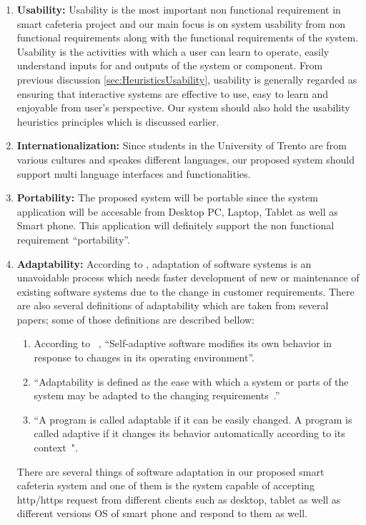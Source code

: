 \begin{enumerate}

\item \textbf{Usability:} Usability is the most important non functional
requirement in smart cafeteria project and our main focus is on system usability
from non functional requirements along with the functional requirements of the
system. Usability is the activities with which a user can learn to operate,
easily understand inputs for and outputs of the system or component. From
previous discussion \ref{sec:HeuristicsUsability}, usability is generally
regarded as ensuring that interactive systems are effective to use, easy to
learn and enjoyable from user's perspective. Our system should also hold the
usability heuristics principles which is discussed earlier.

\item \textbf{Internationalization:} Since students in the University of Trento
are from various cultures and speakes different languages, our proposed system
should support multi language interfaces and functionalities.

\item \textbf{Portability:} The proposed system will be portable since the
system application will be accesable from Desktop PC, Laptop, Tablet as well as
Smart phone. This application will definitely support the non functional
requirement ``portability''.

\item \textbf{Adaptability:} According to \citet{Subramanian2001}, adaptation of
software systems is an unavoidable process which needs faster development of new
 or maintenance of existing software systems  due to the change in customer
requirements. There are also several definitions of adaptability which are taken
from several papers; some of those definitions are described bellow:
\begin{enumerate}
\item  According to ~\citet{Oreizy:769885:Gorlick}, ``Self-adaptive software
modifies its own behavior in response to changes in its operating environment''.

\item  ``Adaptability is defined as the ease with which a system or parts of the
system may be adapted to the changing
requirements~\cite{Subramanian2001,Tekinerdogan}.''

\item  ``A program is called adaptable if it can be easily changed. A program is
called adaptive if it changes its behavior automatically according to its
context~\cite{Subramanian2001,Lieberherr1995}".
\end{enumerate}
There are several things of software adaptation in our proposed smart cafeteria
system and one of them is the system capable of accepting http/https request
from different clients such as desktop, tablet as well as different versions OS
of smart phone and respond to them as well.



\end{enumerate}

